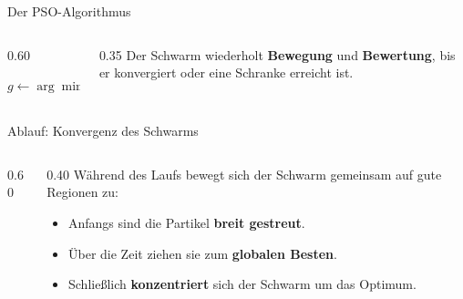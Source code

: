 \begin{frame}{Der PSO-Algorithmus}
\begin{columns}
\begin{column}{0.60\textwidth}
\footnotesize
\begin{algorithm}[H]
\DontPrintSemicolon
\SetAlCapFnt{\footnotesize}
$g \leftarrow \arg\min_i f(p_i)$\;
\caption{\footnotesize Partikelschwarmoptimierung}
\end{algorithm}
\end{column}
\begin{column}{0.35\textwidth}
Der Schwarm wiederholt \textbf{Bewegung} und \textbf{Bewertung}, bis er konvergiert oder eine Schranke erreicht ist.
\end{column}
\end{columns}
\end{frame}


\begin{frame}{Ablauf: Konvergenz des Schwarms}
\begin{columns}
\begin{column}{0.60\textwidth}
\hfill
\\[0.5em]
\hfill

\end{column}
\begin{column}{0.40\textwidth}
Während des Laufs bewegt sich der Schwarm gemeinsam auf gute Regionen zu:
\begin{itemize}
\item Anfangs sind die Partikel \textbf{breit gestreut}.
\item Über die Zeit ziehen sie zum \textbf{globalen Besten}.
\item Schließlich \textbf{konzentriert} sich der Schwarm um das Optimum.
\end{itemize}
\end{column}
\end{columns}
\end{frame}


